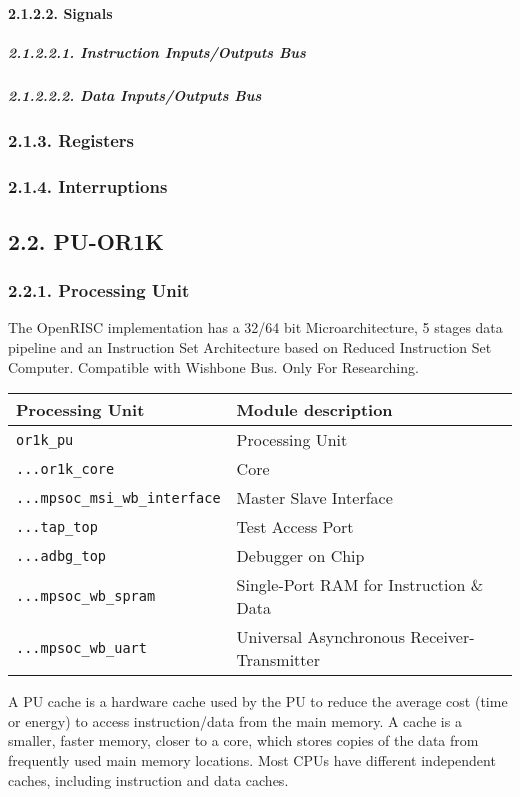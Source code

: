 \documentclass[]{article}
\let\oldparagraph\paragraph
\renewcommand{\paragraph}[1]{\oldparagraph{#1}\mbox{}}
\let\oldsubparagraph\subparagraph
\renewcommand{\subparagraph}[1]{\oldsubparagraph{#1}\mbox{}}
\begin{document}
\paragraph{2.1.2.2. Signals}\label{signals}

\subparagraph{2.1.2.2.1. Instruction Inputs/Outputs
Bus}\label{instruction-inputsoutputs-bus}

\subparagraph{2.1.2.2.2. Data Inputs/Outputs
Bus}\label{data-inputsoutputs-bus}

\subsubsection{2.1.3. Registers}\label{registers}

\subsubsection{2.1.4. Interruptions}\label{interruptions}

\subsection{2.2. PU-OR1K}\label{pu-or1k}

\subsubsection{2.2.1. Processing Unit}\label{processing-unit}

The OpenRISC implementation has a 32/64 bit Microarchitecture, 5 stages
data pipeline and an Instruction Set Architecture based on Reduced
Instruction Set Computer. Compatible with Wishbone Bus. Only For
Researching.

\begin{longtable}[]{@{}ll@{}}
\toprule
Processing Unit & Module description\tabularnewline
\midrule
\endhead
\texttt{or1k\_pu} & Processing Unit\tabularnewline
\texttt{...or1k\_core} & Core\tabularnewline
\texttt{...mpsoc\_msi\_wb\_interface} & Master Slave
Interface\tabularnewline
\texttt{...tap\_top} & Test Access Port\tabularnewline
\texttt{...adbg\_top} & Debugger on Chip\tabularnewline
\texttt{...mpsoc\_wb\_spram} & Single-Port RAM for Instruction \&
Data\tabularnewline
\texttt{...mpsoc\_wb\_uart} & Universal Asynchronous
Receiver-Transmitter\tabularnewline
\bottomrule
\end{longtable}

A PU cache is a hardware cache used by the PU to reduce the average cost
(time or energy) to access instruction/data from the main memory. A
cache is a smaller, faster memory, closer to a core, which stores copies
of the data from frequently used main memory locations. Most CPUs have
different independent caches, including instruction and data caches.
\end{document}
